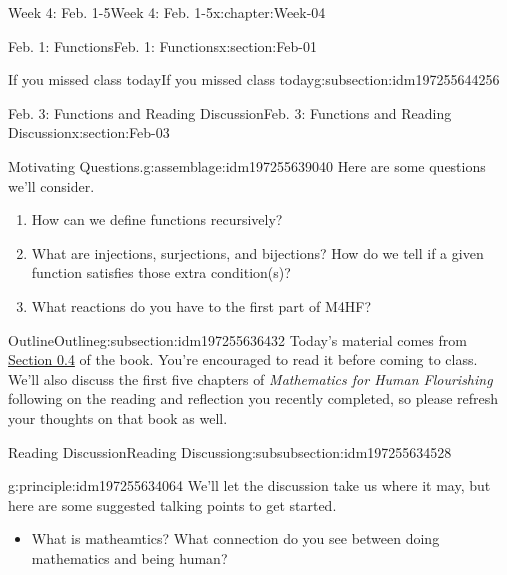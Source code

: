 \documentclass[oneside,10pt,]{book}
\numberwithin{equation}{section}
\begin{document}
\begin{chapterptx}{Week 4: Feb. 1-5}{}{Week 4: Feb. 1-5}{}{}{x:chapter:Week-04}
\begin{sectionptx}{Feb. 1: Functions}{}{Feb. 1: Functions}{}{}{x:section:Feb-01}
\begin{subsectionptx}{If you missed class today}{}{If you missed class today}{}{}{g:subsection:idm197255644256}
\begin{enumerate}
\end{enumerate}
\end{subsectionptx}
\end{sectionptx}
%
%
\typeout{************************************************}
\typeout{************************************************}
%
\begin{sectionptx}{Feb. 3: Functions and Reading Discussion}{}{Feb. 3: Functions and Reading Discussion}{}{}{x:section:Feb-03}
\begin{introduction}{}%
\begin{assemblage}{Motivating Questions.}{g:assemblage:idm197255639040}%
Here are some questions we'll consider. %
\begin{enumerate}
\item{}How can we define functions recursively?%
\item{}What are injections, surjections, and bijections? How do we tell if a given function satisfies those extra condition(s)?%
\item{}What reactions do you have to the first part of M4HF?%
\end{enumerate}
%
\end{assemblage}
\end{introduction}%
%
%
\typeout{************************************************}
\typeout{************************************************}
%
\begin{subsectionptx}{Outline}{}{Outline}{}{}{g:subsection:idm197255636432}
Today's material comes from \href{http://discrete.openmathbooks.org/dmoi3/sec_intro-functions.html}{Section 0.4} of the book. You're encouraged to read it before coming to class. We'll also discuss the first five chapters of \emph{Mathematics for Human Flourishing} following on the reading and reflection you recently completed, so please refresh your thoughts on that book as well.%
%
%
\typeout{************************************************}
\typeout{************************************************}
%
\begin{subsubsectionptx}{Reading Discussion}{}{Reading Discussion}{}{}{g:subsubsection:idm197255634528}
\begin{principle}{}{}{g:principle:idm197255634064}%
We'll let the discussion take us where it may, but here are some suggested talking points to get started.%
%
\begin{itemize}[label=\textbullet]
\item{}What is matheamtics? What connection do you see between doing mathematics and being human?%

\end{itemize}
\end{principle}
\end{subsubsectionptx}
\end{subsectionptx}
\end{sectionptx}
\end{chapterptx}
\end{document}
